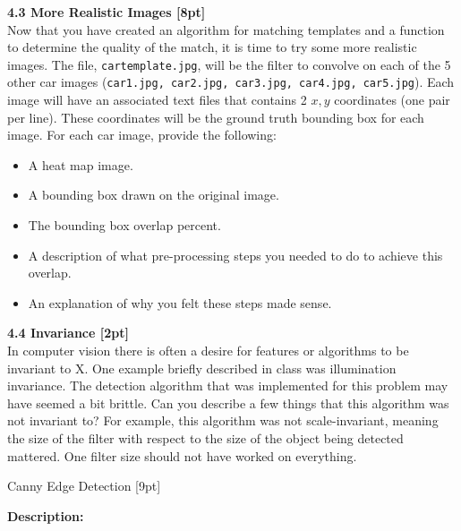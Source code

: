 \documentclass{assignment}
\begin{document}
\begin{problemlist}
\textbf{4.3 More Realistic Images [8pt]}\\
Now that you have created an algorithm for matching templates and a function to determine the quality of the match, it is time to try some more realistic images. The file, \texttt{cartemplate.jpg}, will be the filter to convolve on each of the 5 other car images (\texttt{car1.jpg, car2.jpg, car3.jpg, car4.jpg, car5.jpg}). Each image will have an associated text files that contains 2 $x, y$ coordinates (one pair per line). These coordinates will be the ground truth bounding box for each image. For each car image, provide the following:\\
\begin{itemize}
    \item A heat map image.\\
    \item A bounding box drawn on the original image.\\
    \item The bounding box overlap percent.\\
    \item A description of what pre-processing steps you needed to do to achieve this overlap.\\
    \item An explanation of why you felt these steps made sense.\\
\end{itemize}

\textbf{4.4 Invariance [2pt]}\\
In computer vision there is often a desire for features or algorithms to be invariant to X. One example briefly described in class was illumination invariance. The detection algorithm that was implemented for this problem may have seemed a bit brittle. Can you describe a few things that this algorithm was not invariant to? For example, this algorithm was not scale-invariant, meaning the size of the filter with respect to the size of the object being detected mattered. One filter size should not have worked on everything.

\newpage
\pbitem Canny Edge Detection [9pt]

\textbf{Description:}


\end{problemlist}
\end{document}
